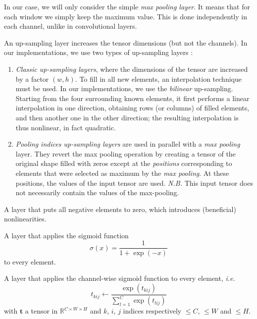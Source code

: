 \documentclass[twocolumn,superscriptaddress,aps,nofootinbib]{revtex4-1}
\begin{document}
\begin{description}[leftmargin=*]
    In our case, we will only consider the simple \emph{max pooling layer}. It means that for each window we simply keep the maximum value. This is done independently in each channel, unlike in convolutional layers.
    \item[Up-sampling] An up-sampling layer increases the tensor dimensions (but not the channels). In our implementations, we use two types of up-sampling layers :
    \begin{enumerate}[leftmargin=*]
        \item \emph{Classic up-sampling layers}, where the dimensions of the tensor are increased by a factor $(w, h)$. To fill in all new elements, an interpolation technique must be used. In our implementations, we use the \emph{bilinear} up-sampling. Starting from the four surrounding known elements, it first performs a linear interpolation in one direction, obtaining rows (or columns) of filled elements, and then another one in the other direction; the resulting interpolation is thus nonlinear, in fact quadratic.
        \item \emph{Pooling indices up-sampling layers} are used in parallel with a \emph{max pooling} layer. They revert the max pooling operation by creating a tensor of the original shape filled with zeros except at the \emph{positions} corresponding to elements that were selected as maximum by the \emph{max pooling}. At these positions, the values of the input tensor are used. \emph{N.B.} This input tensor does not necessarily contain the values of the max-pooling.
    \end{enumerate}
    \item[ReLU] A layer that puts all negative elements to zero, which introduces (beneficial) nonlinearities.
    \item[Sigmoid] A layer that applies the sigmoid function
    \begin{equation}
        \sigma(x) = \frac{1}{1 + \exp(-x)}
    \end{equation}
    to every element.
    \item[Softmax] A layer that applies the channel-wise sigmoid function to every element, \emph{i.e.}
    \begin{equation}
        t_{kij} \leftarrow \frac{\exp(t_{kij})}{\sum_{l=1}^C \exp(t_{lij})}
    \end{equation}
    with $\bm{t}$ a tensor in $\mathbb{R}^{C \times W \times H}$ and $k$, $i$, $j$ indices respectively $\leq C$, $\leq W$ and $\leq H$.


\end{description}
\end{document}
